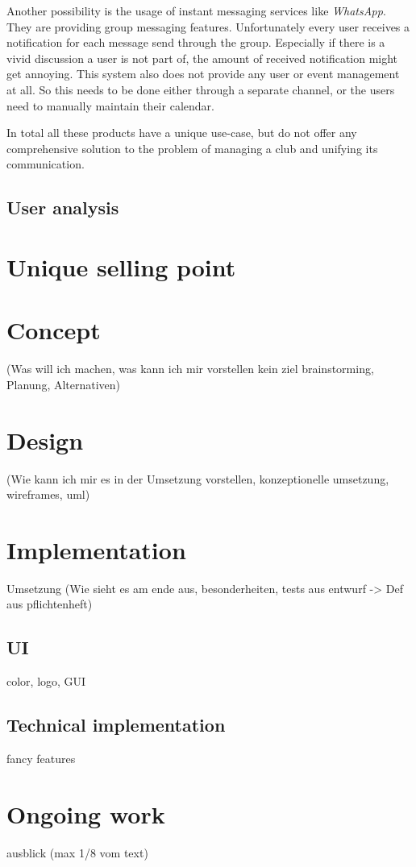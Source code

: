 Another possibility is the usage of instant messaging services like \emph{WhatsApp}. They are providing group messaging features. Unfortunately every user receives a notification for each message send through the group. Especially if there is a vivid discussion a user is not part of, the amount of received notification might get annoying. This system also does not provide any user or event management at all. So this needs to be done either through a separate channel, or the users need to manually maintain their calendar.

In total all these products have a unique use-case, but do not offer any comprehensive solution to the problem of managing a club and unifying its communication. 

\section{User analysis}


\chapter{Unique selling point}

\chapter{Concept}
(Was will ich machen, was kann ich mir vorstellen kein ziel brainstorming, Planung, Alternativen)

\chapter{Design}
(Wie kann ich mir es in der Umsetzung vorstellen, konzeptionelle umsetzung, wireframes, uml)

\chapter{Implementation}
Umsetzung (Wie sieht es am ende aus, besonderheiten, tests aus entwurf -> Def aus pflichtenheft)

\section{UI}
color, logo, GUI

\section{Technical implementation}

fancy features

\chapter{Ongoing work}
ausblick (max 1/8 vom text)

